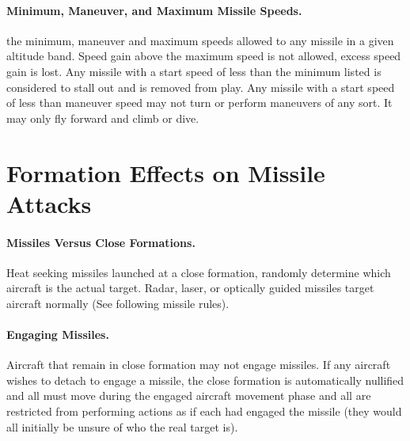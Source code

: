 \begin{advancedrules}
\paragraph{Minimum, Maneuver, and Maximum Missile Speeds.}  the minimum, maneuver and maximum speeds allowed to any missile in a given altitude band. Speed gain above the maximum speed is not allowed, excess speed gain is lost. Any missile with a start speed of less than the minimum listed is considered to stall out and is removed from play. Any missile with a start speed of less than maneuver speed may not turn or perform maneuvers of any sort. It may only fly forward and climb or dive.

\section{Formation Effects on Missile Attacks}

\paragraph{Missiles Versus Close Formations.} Heat seeking missiles launched at a close formation, randomly determine which aircraft is the actual target. Radar, laser, or optically guided missiles target aircraft normally (See following missile rules).

\paragraph{Engaging Missiles.} Aircraft that remain in close formation may not engage missiles. If any aircraft wishes to detach to engage a missile, the close formation is automatically nullified and all must move during the engaged aircraft movement phase and all are restricted from performing actions as if each had engaged the missile (they would all initially be unsure of who the real target is).

\end{advancedrules}

